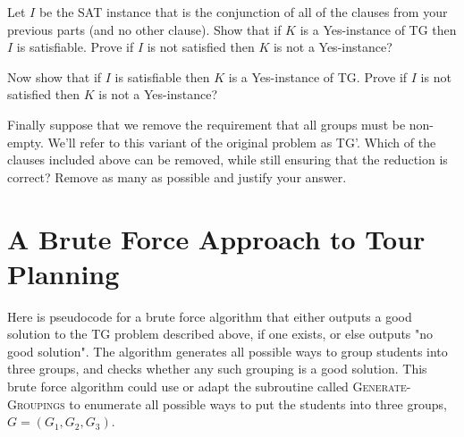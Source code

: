 \documentclass[11pt,fleqn]{exam}
\newif\ifsolutions\solutionsfalse
\newenvironment{soln}{\color{solnblue}}{}
\begin{document}
\begin{questions}
  \ifsolutions
    
  \fi
  \question[3]
  Let $I$ be the SAT instance that is the conjunction of all of the clauses from your previous parts (and no other clause). Show that if $K$ is a Yes-instance of TG then $I$ is satisfiable.
  \begin{soln}
    Prove if $I$ is not satisfied then $K$ is not a Yes-instance?
  \end{soln}
  \ifsolutions
    
  \fi

  \question[3]
  Now show that if $I$ is satisfiable then $K$ is a Yes-instance of TG.
  \begin{soln}
    Prove if $I$ is not satisfied then $K$ is not a Yes-instance?
  \end{soln}
  \ifsolutions
    
  \fi

  \question[4]
  Finally suppose that we remove the requirement that all groups must be non-empty.
  We'll refer to this variant of the original problem as TG'.
  Which of the clauses included above can be removed, while still ensuring that the reduction is correct? Remove as many as possible and justify your answer.

  \ifsolutions
    
  \fi
\end{questions}

\clearpage

\section{A Brute Force Approach to Tour Planning}
Here is pseudocode for a brute force algorithm that either outputs a good solution to the TG problem described above, if one exists, or else outputs "no good solution". The algorithm generates all possible ways to group students into three groups, and checks whether any such grouping is a good solution. This brute force algorithm could use or adapt the subroutine called \textsc{Generate-Groupings} to enumerate all possible ways to put the students into three groups, $G = (G_1,G_2,G_3)$.
\end{document}
